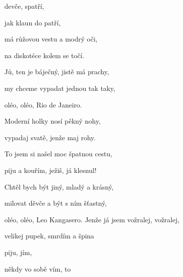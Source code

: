 
\zs
{} devče,  spatří,

 jak klaun do  patří,

má růžovou vestu a modrý oči,

na diskotéce kolem se točí.

Jů, ten je báječný, jistě má prachy,

my chceme vypadat jednou tak taky,

oléo, oléo, Rio de Janeiro.
\ks

\zs
Moderní holky nosí pěkný nohy,

vypadaj svatě, jenže maj rohy.

To jsem si našel moc špatnou cestu,

piju a kouřím, ježiš, já klesnul!

Chtěl bych být jiný, mladý a krásný,

milovat děvče a být s ním šťastný,

oléo, oléo, Leo Kangasero.
\ks
\zr
Jenže já jsem  vožralej,  vožralej,

 velikej pupek, smrdím a  špina

 piju, jím, 

 někdy vo sobě vím,  to 
\kr

\zr\kr
\kp




